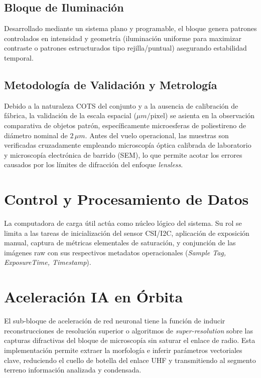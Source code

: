 \subsection{Bloque de Iluminación}
Desarrollado mediante un sistema plano y programable, el bloque genera patrones controlados en intensidad y geometría (iluminación uniforme para maximizar contraste o patrones estructurados tipo rejilla/puntual) asegurando estabilidad temporal.

\subsection{Metodología de Validación y Metrología}
Debido a la naturaleza COTS del conjunto y a la ausencia de calibración de fábrica, la validación de la escala espacial ($\mu m/\text{pixel}$) se asienta en la observación comparativa de objetos patrón, específicamente microesferas de poliestireno de diámetro nominal de $2\,\mu m$. Antes del vuelo operacional, las muestras son verificadas cruzadamente empleando microscopía óptica calibrada de laboratorio y microscopía electrónica de barrido (SEM), lo que permite acotar los errores causados por los límites de difracción del enfoque \textit{lensless}.

\section{Control y Procesamiento de Datos}
La computadora de carga útil actúa como núcleo lógico del sistema. Su rol se limita a las tareas de inicialización del sensor CSI/I2C, aplicación de exposición manual, captura de métricas elementales de saturación, y conjunción de las imágenes raw con sus respectivos metadatos operacionales (\textit{Sample Tag, ExposureTime, Timestamp}). 

\section{Aceleración IA en Órbita}
El sub-bloque de aceleración de red neuronal tiene la función de inducir reconstrucciones de resolución superior o algoritmos de \textit{super-resolution} sobre las capturas difractivas del bloque de microscopía sin saturar el enlace de radio. Esta implementación permite extraer la morfología e inferir parámetros vectoriales clave, reduciendo el cuello de botella del enlace UHF y transmitiendo al segmento terreno información analizada y condensada.
